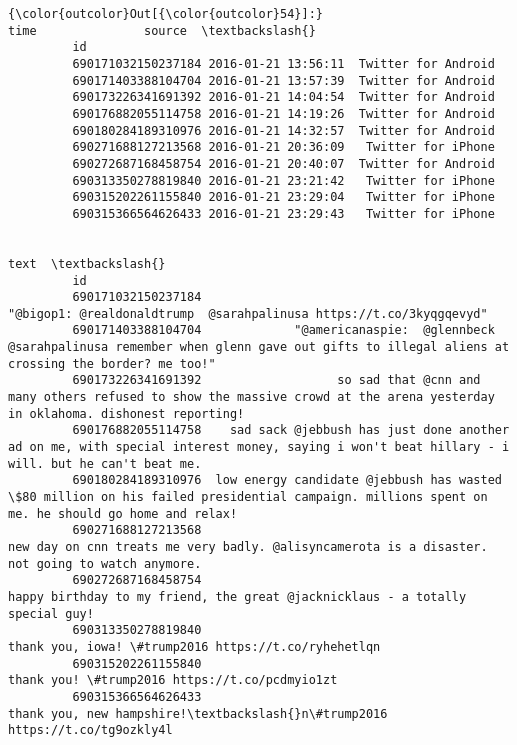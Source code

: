 \documentclass[11pt]{article}
\begin{document}
\begin{Verbatim}[commandchars=\\\{\}]
{\color{outcolor}Out[{\color{outcolor}54}]:}                                   time               source  \textbackslash{}
         id                                                            
         690171032150237184 2016-01-21 13:56:11  Twitter for Android   
         690171403388104704 2016-01-21 13:57:39  Twitter for Android   
         690173226341691392 2016-01-21 14:04:54  Twitter for Android   
         690176882055114758 2016-01-21 14:19:26  Twitter for Android   
         690180284189310976 2016-01-21 14:32:57  Twitter for Android   
         690271688127213568 2016-01-21 20:36:09   Twitter for iPhone   
         690272687168458754 2016-01-21 20:40:07  Twitter for Android   
         690313350278819840 2016-01-21 23:21:42   Twitter for iPhone   
         690315202261155840 2016-01-21 23:29:04   Twitter for iPhone   
         690315366564626433 2016-01-21 23:29:43   Twitter for iPhone   
         
                                                                                                                                                                     text  \textbackslash{}
         id                                                                                                                                                                 
         690171032150237184                                                                           "@bigop1: @realdonaldtrump  @sarahpalinusa https://t.co/3kyqgqevyd"   
         690171403388104704             "@americanaspie:  @glennbeck @sarahpalinusa remember when glenn gave out gifts to illegal aliens at crossing the border? me too!"   
         690173226341691392                   so sad that @cnn and many others refused to show the massive crowd at the arena yesterday in oklahoma. dishonest reporting!   
         690176882055114758    sad sack @jebbush has just done another ad on me, with special interest money, saying i won't beat hillary - i will. but he can't beat me.   
         690180284189310976  low energy candidate @jebbush has wasted \$80 million on his failed presidential campaign. millions spent on me. he should go home and relax!   
         690271688127213568                                               new day on cnn treats me very badly. @alisyncamerota is a disaster. not going to watch anymore.   
         690272687168458754                                                                 happy birthday to my friend, the great @jacknicklaus - a totally special guy!   
         690313350278819840                                                                                           thank you, iowa! \#trump2016 https://t.co/ryhehetlqn   
         690315202261155840                                                                                                 thank you! \#trump2016 https://t.co/pcdmyio1zt   
         690315366564626433                                                                                 thank you, new hampshire!\textbackslash{}n\#trump2016 https://t.co/tg9ozkly4l   
         

\end{Verbatim}
\end{document}
